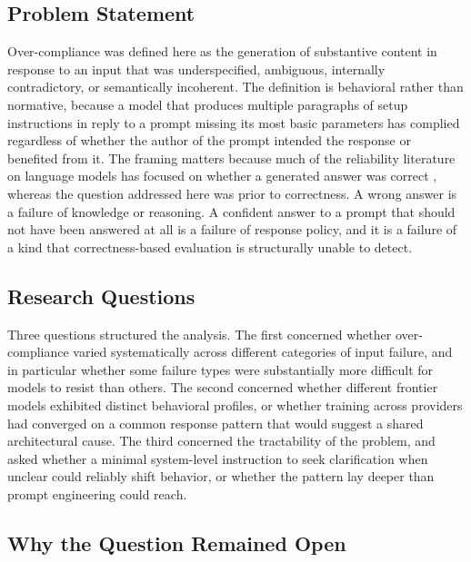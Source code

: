 \documentclass[10pt]{article}
\begin{document}
\subsection{Problem Statement}

Over-compliance was defined here as the generation of substantive content in response to an input that was underspecified, ambiguous, internally contradictory, or semantically incoherent. The definition is behavioral rather than normative, because a model that produces multiple paragraphs of setup instructions in reply to a prompt missing its most basic parameters has complied regardless of whether the author of the prompt intended the response or benefited from it. The framing matters because much of the reliability literature on language models has focused on whether a generated answer was correct \citep{ji2023survey,huang2023survey}, whereas the question addressed here was prior to correctness. A wrong answer is a failure of knowledge or reasoning. A confident answer to a prompt that should not have been answered at all is a failure of response policy, and it is a failure of a kind that correctness-based evaluation is structurally unable to detect.

\subsection{Research Questions}

Three questions structured the analysis. The first concerned whether over-compliance varied systematically across different categories of input failure, and in particular whether some failure types were substantially more difficult for models to resist than others. The second concerned whether different frontier models exhibited distinct behavioral profiles, or whether training across providers had converged on a common response pattern that would suggest a shared architectural cause. The third concerned the tractability of the problem, and asked whether a minimal system-level instruction to seek clarification when unclear could reliably shift behavior, or whether the pattern lay deeper than prompt engineering could reach.

\subsection{Why the Question Remained Open}
\end{document}
